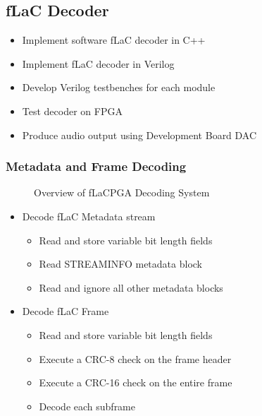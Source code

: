 \documentclass[12pt]{scrartcl}
\begin{document}
  \subsection{fLaC Decoder}
  \begin{itemize}
  \item Implement software fLaC decoder in C++
  \item Implement fLaC decoder in Verilog
  \item Develop Verilog testbenches for each module
  \item Test decoder on FPGA
  \item Produce audio output using Development Board DAC
  \end{itemize}
  
  \subsubsection{Metadata and Frame Decoding}
  \begin{figure}[H]
    \caption{Overview of fLaCPGA Decoding System}
    \label{fig:system_overview}
  \end{figure}
  
  \begin{itemize}
  \item Decode fLaC Metadata stream
    \begin{itemize}
    \item Read and store variable bit length fields
    \item Read STREAMINFO metadata block
    \item Read and ignore all other metadata blocks
    \end{itemize}
  \item Decode fLaC Frame
    \begin{itemize}
    \item Read and store variable bit length fields
    \item Execute a CRC-8 check on the frame header
    \item Execute a CRC-16 check on the entire frame
    \item Decode each subframe
    \end{itemize}
  \end{itemize}
  
\end{document}
